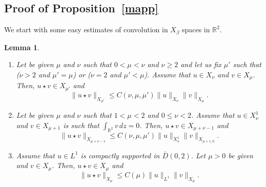 \documentclass[10pt]{amsart}
\newtheorem{lemm}[theo]{Lemma}\newtheorem{prop}[theo]{Proposition}\newtheorem{coro}[theo]{Corollary}\newtheorem{conj}[theo]{Conjecture}
\theoremstyle{definition}\newtheorem{defi}[theo]{Definition}\newtheorem{rema}[theo]{Remark}\newtheorem{exam}[theo]{Example}\newtheorem{exem}[theo]{Example}\newtheorem{nota}[theo]{Notation}
\newcommand*\R{\mathbb R}
\newcommand*\gs{\geqslant }
\newcommand*\ls{\leqslant }
\newcommand*{\romanenumi}{\renewcommand*{\theenumi}{\roman{enumi}}}
\begin{document}
\subsection{Proof of Proposition~\ref{mapp}}

We start with some easy estimates of convolution in $X_\beta $ spaces in $ \R^2 $.
\pagebreak

\begin{lemm}\label{decay}\leavevmode
\begin{enumerate}\romanenumi
\item\label{lemm4.1.1} Let be given $ \mu $ and $ \nu $ such that $ 0 < \mu < \nu $ and $ \nu \gs 2 $ and let us fix $ \mu' $ such that ($ \nu > 2 $ and $ \mu' = \mu $) or ($ \nu = 2 $ and $ \mu' < \mu $). Assume that $ u \in X_\nu $ and $ v \in X_\mu $. Then, $ u \star v \in X_{\mu'} $ and
\[
\| u \star v \|_{ X_{\mu'} } \ls C(\nu, \mu, \mu') \| u \|_{ X_{\nu} } \| v \|_{ X_{\mu} }.
\]
\item\label{lemm4.1.2} Let be given $ \mu $ and $ \nu $ such that $ 1 < \mu < 2 $ and $ 0 \ls \nu < 2 $. Assume that $ u \in X^1_\nu $ and $ v \in X_{\mu+1} $ is such that $ \int_{\R^2 } v \, dz = 0 $. Then, $ u \star v \in X_{\mu + \nu - 1 } $ and
\[
\| u \star v \|_{ X_{\mu + \nu -1 } } \ls C(\nu, \mu, \mu') \| u \|_{ X^1_{\nu} } \| v \|_{ X_{\mu +1, 0} }.
\]
\item\label{lemm4.1.3} Assume that $ u \in L^1 $ is compactly supported in $ \bar{D}(0, 2) $. Let $ \mu > 0 $ be given and $ v \in X_\mu $. Then, $ u \star v \in X_{\mu} $ and
\[
\| u \star v \|_{ X_{\mu} } \ls C(\mu) \| u \|_{ L^1 } \| v \|_{ X_{\mu} }.
\]
\end{enumerate}
\end{lemm}
\end{document}
